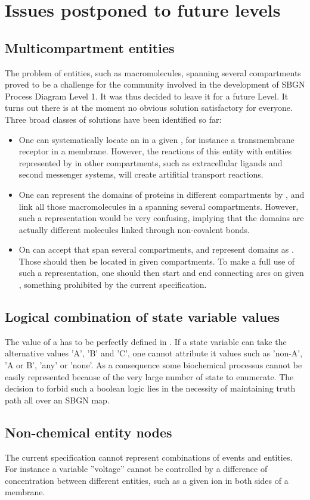 \chapter{Issues postponed to future levels}

\section{Multicompartment entities}

The problem of entities, such as macromolecules, spanning several compartments proved to be a challenge for the community involved in the development of SBGN Process Diagram Level 1. It was thus decided to leave it for a future Level. It turns out there is at the moment no obvious solution satisfactory for everyone. Three broad classes of solutions have been identified so far:

\begin{itemize}
\item One can systematically locate an  in a given , for instance a transmembrane receptor in a membrane. However, the reactions of this entity with entities represented by  in other compartments, such as extracellular ligands and second messenger systems, will create artifitial transport reactions.
\item One can represent the domains of proteins in different compartments by , and link all those macromolecules in a  spanning several compartments. However, such a representation would be very confusing, implying that the domains are actually different molecules linked through non-covalent bonds.
\item On can accept  that span several compartments, and represent domains as . Those  should then be located in given compartments. To make a full use of such a representation, one should then start and end connecting arcs on given , something prohibited by the current specification.
\end{itemize}

\section{Logical combination of state variable values}

The value of a  has to be perfectly defined in \SBGNPDLone. If a state variable can take the alternative values 'A', 'B' and 'C',  one cannot attribute it values such as 'non-A', 'A or B', 'any' or 'none'. As a consequence some biochemical processus cannot be easily represented because of the very large number of state to enumerate. The decision to forbid such a boolean logic lies in the necessity of maintaining truth path all over an SBGN map. 

\section{Non-chemical entity nodes}

The current specification cannot represent combinations of events and entities. For instance a variable ''voltage'' cannot be controlled by a difference of concentration between different entities, such as a given ion in both sides of a membrane. 
